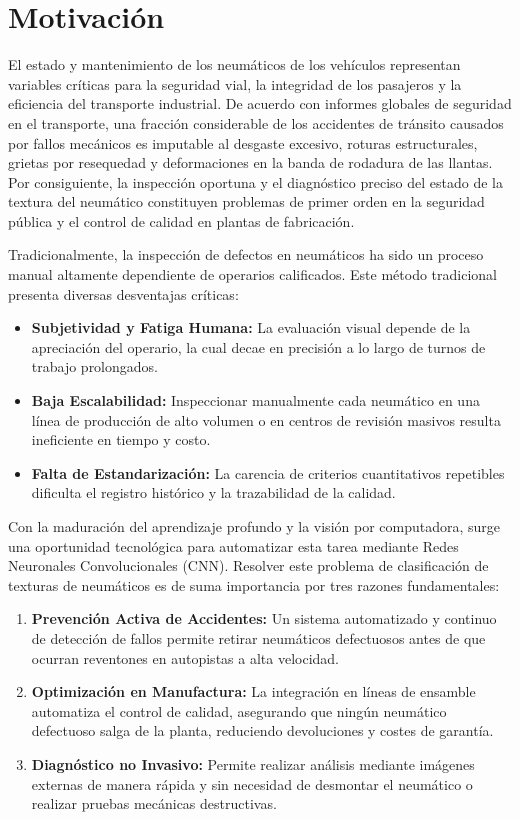 \section{Motivación}
El estado y mantenimiento de los neumáticos de los vehículos representan variables críticas para la seguridad vial, la integridad de los pasajeros y la eficiencia del transporte industrial. De acuerdo con informes globales de seguridad en el transporte, una fracción considerable de los accidentes de tránsito causados por fallos mecánicos es imputable al desgaste excesivo, roturas estructurales, grietas por resequedad y deformaciones en la banda de rodadura de las llantas. Por consiguiente, la inspección oportuna y el diagnóstico preciso del estado de la textura del neumático constituyen problemas de primer orden en la seguridad pública y el control de calidad en plantas de fabricación.

Tradicionalmente, la inspección de defectos en neumáticos ha sido un proceso manual altamente dependiente de operarios calificados. Este método tradicional presenta diversas desventajas críticas:
\begin{itemize}
    \item \textbf{Subjetividad y Fatiga Humana:} La evaluación visual depende de la apreciación del operario, la cual decae en precisión a lo largo de turnos de trabajo prolongados.
    \item \textbf{Baja Escalabilidad:} Inspeccionar manualmente cada neumático en una línea de producción de alto volumen o en centros de revisión masivos resulta ineficiente en tiempo y costo.
    \item \textbf{Falta de Estandarización:} La carencia de criterios cuantitativos repetibles dificulta el registro histórico y la trazabilidad de la calidad.
\end{itemize}

Con la maduración del aprendizaje profundo y la visión por computadora, surge una oportunidad tecnológica para automatizar esta tarea mediante Redes Neuronales Convolucionales (CNN). Resolver este problema de clasificación de texturas de neumáticos es de suma importancia por tres razones fundamentales:
\begin{enumerate}
    \item \textbf{Prevención Activa de Accidentes:} Un sistema automatizado y continuo de detección de fallos permite retirar neumáticos defectuosos antes de que ocurran reventones en autopistas a alta velocidad.
    \item \textbf{Optimización en Manufactura:} La integración en líneas de ensamble automatiza el control de calidad, asegurando que ningún neumático defectuoso salga de la planta, reduciendo devoluciones y costes de garantía.
    \item \textbf{Diagnóstico no Invasivo:} Permite realizar análisis mediante imágenes externas de manera rápida y sin necesidad de desmontar el neumático o realizar pruebas mecánicas destructivas.
\end{enumerate}

